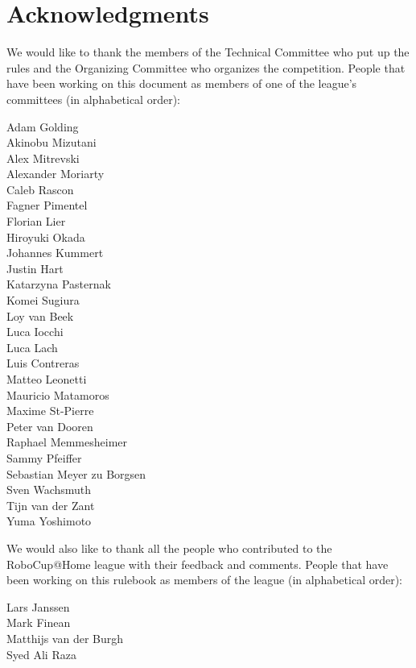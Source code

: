\section*{Acknowledgments}
\label{sec:acknowledgments}
We would like to thank the members of the Technical Committee who put up the rules and the Organizing Committee who organizes the competition.
People that have been working on this document as members of one of the league's committees (in alphabetical order):
\begin{center}
	\begin{minipage}{0.8\textwidth}
		\begin{multicols}{3}%
			\footnotesize
			\noindent%
			Adam Golding\\
			Akinobu Mizutani\\
			Alex Mitrevski\\
			Alexander Moriarty\\
			Caleb Rascon\\
			Fagner Pimentel\\
			Florian Lier\\
			Hiroyuki Okada\\
			Johannes Kummert\\
			Justin Hart\\
			Katarzyna Pasternak\\
			Komei Sugiura\\
			Loy van Beek\\
			Luca Iocchi\\
			Luca Lach\\
			Luis Contreras\\
			Matteo Leonetti\\
			Mauricio Matamoros\\
			Maxime St-Pierre\\
			Peter van Dooren\\
			Raphael Memmesheimer\\
			Sammy Pfeiffer\\
			Sebastian Meyer zu Borgsen\\
			Sven Wachsmuth\\
			Tijn van der Zant\\
			Yuma Yoshimoto
		\end{multicols}
	\end{minipage}
\end{center}

\noindent We would also like to thank all the people who contributed to the RoboCup@Home league with their feedback and comments.
People that have been working on this rulebook as members of the league (in alphabetical order):
\begin{center}
	\begin{minipage}{0.8\textwidth}
		\begin{multicols}{2}%
			\footnotesize
			\noindent%
			Lars Janssen\\
			Mark Finean\\
			Matthijs van der Burgh\\
			Syed Ali Raza\\
		\end{multicols}
	\end{minipage}
\end{center}


